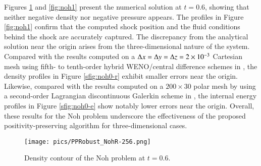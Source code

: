 Figures \ref{fig:noh0} and \ref{fig:noh1} present the numerical solution at $t = 0.6$, showing that neither negative density nor negative pressure appears.
The profiles in Figure \ref{fig:noh1} confirm that the computed shock position and the fluid conditions behind the shock are accurately captured. The discrepancy from the analytical solution near the origin arises from the three-dimensional nature of the system.
Compared with the results computed on a $\mathrm\Delta x = \mathrm\Delta y= \mathrm\Delta z = 2 \times 10^{-3}$ Cartesian mesh using fifth- to tenth-order hybrid WENO/central difference schemes in \cite{johnsen2010assessment}, 
the density profiles in Figure \ref{sfig:noh0-r} exhibit smaller errors near the origin.  
Likewise, compared with the results computed on a $200 \times 30$ polar mesh by using a second-order Lagrangian discontinuous Galerkin scheme in \cite{li2014cell},
the internal energy profiles in Figure \ref{sfig:noh0-e} show notably lower errors near the origin.
Overall, these results for the Noh problem underscore the effectiveness of the proposed positivity-preserving algorithm for three-dimensional cases.


\begin{figure}[htbp!]
    \centering
    \texttt{[image: pics/PPRobust\_NohR-256.png]}
    \caption{Density contour of the Noh problem at $t=0.6$.}
    \label{fig:noh0}
\end{figure}

